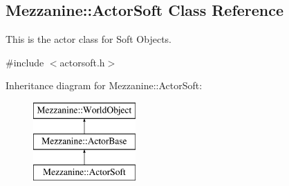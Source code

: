 \hypertarget{classMezzanine_1_1ActorSoft}{
\subsection{Mezzanine::ActorSoft Class Reference}
\label{classMezzanine_1_1ActorSoft}
}


This is the actor class for Soft Objects.  




{\ttfamily \#include $<$actorsoft.h$>$}

Inheritance diagram for Mezzanine::ActorSoft:\begin{figure}[H]
\begin{center}
\leavevmode
\includegraphics[height=3.000000cm]{classMezzanine_1_1ActorSoft}
\end{center}
\end{figure}
